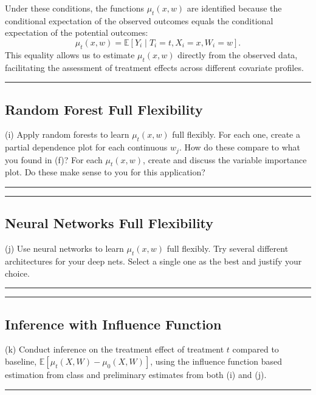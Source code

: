 \documentclass{article}
\newenvironment{colorparagraph}[1]{\par\color{#1}}{\par}
\begin{document}
Under these conditions, the functions \( \mu_t(x, w) \) are identified because the conditional expectation of the observed outcomes equals the conditional expectation of the potential outcomes:
\[
\mu_t(x, w) = \mathbb{E}[Y_i \mid T_i = t, X_i = x, W_i = w].
\]
This equality allows us to estimate \( \mu_t(x, w) \) directly from the observed data, facilitating the assessment of treatment effects across different covariate profiles.

\begin{colorparagraph}{questioncolor}
\label{q3i}
\rule{\textwidth}{0.5pt}
\subsection{Random Forest Full Flexibility}
(i) Apply random forests to learn \( \mu_t(x, w) \) full flexibly. For each one, create a partial dependence plot for each continuous \( w_j \). How do these compare to what you found in (f)? For each \( \mu_t(x, w) \), create and discuss the variable importance plot. Do these make sense to you for this application?

\rule{\textwidth}{0.5pt}
\end{colorparagraph}

\begin{colorparagraph}{questioncolor}
\label{q3j}
\rule{\textwidth}{0.5pt}
\subsection{Neural Networks Full Flexibility}
(j) Use neural networks to learn \( \mu_t(x, w) \) full flexibly. Try several different architectures for your deep nets. Select a single one as the best and justify your choice.

\rule{\textwidth}{0.5pt}
\end{colorparagraph}

\begin{colorparagraph}{questioncolor}
\label{q3k}
\rule{\textwidth}{0.5pt}
\subsection{Inference with Influence Function}
(k) Conduct inference on the treatment effect of treatment \( t \) compared to baseline, \( \mathbb{E}[\mu_t(X, W) - \mu_0(X, W)] \), using the influence function based estimation from class and preliminary estimates from both (i) and (j).

\rule{\textwidth}{0.5pt}
\end{colorparagraph}
\end{document}
